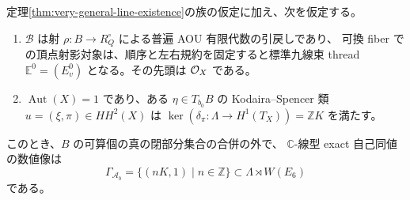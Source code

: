 \begin{theorem}
\label{thm:very-general-numerical-aut}
定理\ref{thm:very-general-line-existence}の族の仮定に加え、次を仮定する。
\begin{enumerate}
\item $\mathscr B$ は射 $\rho:B\to R_Q^\circ$ による普遍 AOU 有限代数の引戻しであり、
      可換 fiber での頂点射影対象は、順序と左右規約を固定すると標準九線束 thread
      $\mathbb E^0=(E_v^0)$ となる。その先頭は $\mathcal O_X$ である。
\item $\operatorname{Aut}(X)=1$ であり、ある $\eta\in T_{b_0}B$ の
      Kodaira--Spencer 類 $u=(\xi,\pi)\in HH^2(X)$ は
      $\ker(\delta_\pi:\Lambda\to H^1(T_X))=\mathbb ZK$ を満たす。
\end{enumerate}
このとき、$B$ の可算個の真の閉部分集合の合併の外で、
$\mathbb C$-線型 exact 自己同値の数値像は
\begin{equation}\label{eq:generic-numerical-aut}
 \Gamma_{\mathcal A_b}=\{(nK,1)\mid n\in\mathbb Z\}
 \subset\Lambda\rtimes W(E_6)
\end{equation}
である。
\end{theorem}
